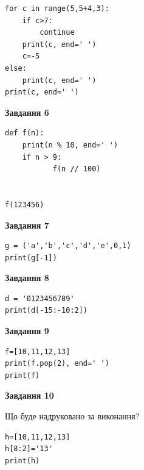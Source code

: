 \documentclass[12pt, ukrainian]{article}
\begin{document}
{{{{{{{{{\begin{minipage}[t]{10.5cm}
\begin{verbatim}
for c in range(5,5+4,3):
    if c>7:
        continue
    print(c, end=' ')
    c=-5
else:
    print(c, end=' ')
print(c, end=' ')
\end{verbatim}



\begin{center}
\textbf{Завдання 6}
\end{center}

\begin{verbatim}
def f(n):
    print(n % 10, end=' ')
    if n > 9:
           f(n // 100)
    

f(123456)
\end{verbatim}



\begin{center}
\textbf{Завдання 7}
\end{center}

\begin{verbatim}
g = ('a','b','c','d','e',0,1)
print(g[-1])
\end{verbatim}



\begin{center}
\textbf{Завдання 8}
\end{center}

\begin{verbatim}
d = '0123456789'
print(d[-15:-10:2])
\end{verbatim}



\begin{center}
\textbf{Завдання 9}
\end{center}

\begin{verbatim}
f=[10,11,12,13]
print(f.pop(2), end=' ')
print(f)
\end{verbatim}



\begin{center}
\textbf{Завдання 10}
\end{center}
Що буде надруковано за виконання?\par
\begin{verbatim}
h=[10,11,12,13]
h[8:2]='13'
print(h)
\end{verbatim}

\end{minipage}

}
\newpage

}}}}}}}}
\end{document}
